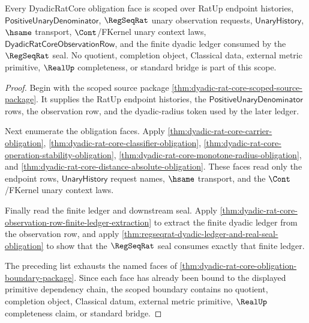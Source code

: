 \begin{theorem}
\label{thm:dyadic-rat-core-scoped-closure-boundary}
Every DyadicRatCore obligation face is scoped over RatUp endpoint histories,
$\mathsf{PositiveUnaryDenominator}$, $\RegSeqRat$ unary observation requests,
$\mathsf{UnaryHistory}$, $\hsame$ transport, $\Cont$/FKernel unary context
laws, $\mathsf{DyadicRatCoreObservationRow}$, and the finite dyadic ledger
consumed by the $\RegSeqRat$ seal. No quotient, completion object, Classical
data, external metric primitive, $\RealUp$ completeness, or standard bridge is
part of this scope.
\end{theorem}
\begin{proof}
Begin with the scoped source package
\autoref{thm:dyadic-rat-core-scoped-source-package}. It supplies the RatUp
endpoint histories, the $\mathsf{PositiveUnaryDenominator}$ rows, the
observation row, and the dyadic-radius token used by the later ledger.

Next enumerate the obligation faces. Apply
\autoref{thm:dyadic-rat-core-carrier-obligation},
\autoref{thm:dyadic-rat-core-classifier-obligation},
\autoref{thm:dyadic-rat-core-operation-stability-obligation},
\autoref{thm:dyadic-rat-core-monotone-radius-obligation}, and
\autoref{thm:dyadic-rat-core-distance-absolute-obligation}. These faces read
only the endpoint rows, $\mathsf{UnaryHistory}$ request names, $\hsame$
transport, and the $\Cont$/FKernel unary context laws.

Finally read the finite ledger and downstream seal. Apply
\autoref{thm:dyadic-rat-core-observation-row-finite-ledger-extraction} to
extract the finite dyadic ledger from the observation row, and apply
\autoref{thm:regseqrat-dyadic-ledger-and-real-seal-obligation} to show that
the $\RegSeqRat$ seal consumes exactly that finite ledger.

The preceding list exhausts the named faces of
\autoref{thm:dyadic-rat-core-obligation-boundary-package}. Since each face has
already been bound to the displayed primitive dependency chain, the scoped
boundary contains no quotient, completion object, Classical datum, external
metric primitive, $\RealUp$ completeness claim, or standard bridge.
\end{proof}

